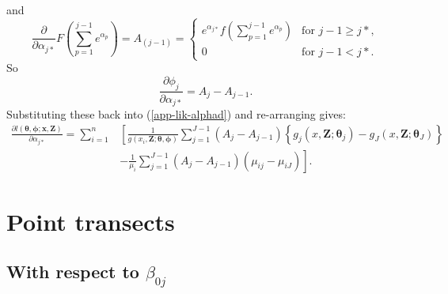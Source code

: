 and
\begin{equation*}
\frac{\partial}{\partial \alpha_{j*}} F \left (\sum_{p=1}^{j-1} e^{\alpha_p} \right )=A_{(j-1)}=\begin{cases}
e^{\alpha_{j*}}f \left (\sum_{p=1}^{j-1} e^{\alpha_p} \right )& \text{for $j-1\geq j*$},\\
0 & \text{for $j-1<j*$}.
\end{cases}
\end{equation*}
So
\begin{equation*}
\frac{\partial \phi_j}{\partial \alpha_{j*}} = A_j - A_{j-1}.
\end{equation*}
Substituting these back into (\ref{app-lik-alphad}) and re-arranging gives:
\begin{align*}
\frac{\partial l(\bm{\theta},\bm{\phi}; \mathbf{x},\mathbf{Z})}{\partial \alpha_{j*}} = \sum_{i=1}^n & \left [ \frac{1}{g(x_i,\mathbf{Z}; \bm{\theta},\bm{\phi})} \sum_{j=1}^{J-1} \left (A_j - A_{j-1} \right ) \left \{ g_j(x,\mathbf{Z}; \bm{\theta}_j) - g_J(x,\mathbf{Z}; \bm{\theta}_J) \right \} \right. \\
&- \left. \frac{1}{\mu_i} \sum_{j=1}^{J-1} \left (A_j - A_{j-1}\right ) \left (\mu_{ij} - \mu_{iJ} \right ) \right ].
\end{align*}

\section{Point transects}

\subsection{With respect to $\beta_{0j}$}

